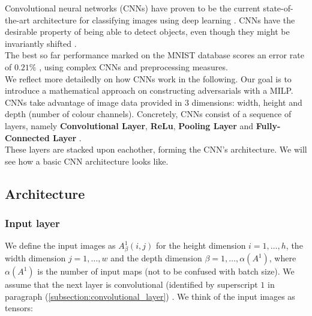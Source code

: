\documentclass{article}
\begin{document}
Convolutional neural networks (CNNs) have proven to be the current state-of-the-art architecture for classifying images using deep learning \cite{wiki_convnets}. CNNs have the desirable property of being able to detect objects, even though they might be invariantly shifted \cite{wiki_convnets}.\\
The best so far performance marked on the MNIST database scores an error rate of $0.21\% $ \cite{wiki_mnist}, using complex CNNs and preprocessing measures.\\ 
We reflect more detailedly on how CNNs work in the following. Our goal is to introduce a mathematical approach on constructing adversarials with a MILP.\\
CNNs take advantage of image data provided in 3 dimensions: width, height and depth (number of colour channels). Concretely, CNNs consist of a sequence of layers, namely \textbf{Convolutional Layer}, \textbf{ReLu}, \textbf{Pooling Layer} and \textbf{Fully-Connected Layer} \cite{cs231:optimizers}.\\
These layers are stacked upon eachother, forming the CNN's architecture. We will see how a basic CNN architecture looks like.

\subsection{Architecture}

\subsubsection{Input layer} We define the input images as $A_\beta^1(i,j)$ for the height dimension $i=1, \ldots, h$, the width dimension $j=1, \ldots, w$ and the depth dimension $\beta = 1, \ldots, \alpha(A^1)$, where $\alpha(A^1)$ is the number of input maps (not to be confused with batch size). We assume that the next layer is convolutional (identified by superscript $1$ in paragraph (\ref{subsection:convolutional_layer}) . We think of the input images as tensors:
\end{document}

